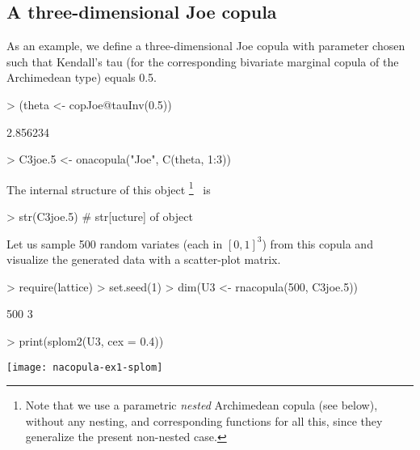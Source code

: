 \documentclass[nojss,article]{jss}
\theoremstyle{mythmstyle}
\begin{document}
\subsection{A three-dimensional Joe copula}
As an example, we define a three-dimensional Joe copula with
parameter chosen such that Kendall's tau (for the corresponding bivariate
marginal copula of the Archimedean type) equals 0.5.
\begin{Schunk}
\begin{Sinput}
> (theta <- copJoe@tauInv(0.5))
\end{Sinput}
\begin{Soutput}
[1] 2.856234
\end{Soutput}
\begin{Sinput}
> C3joe.5 <- onacopula("Joe", C(theta, 1:3))
\end{Sinput}
\end{Schunk}
The internal structure of this object%
\footnote{Note that we use a parametric \emph{nested} Archimedean copula (see
  below), without any nesting, and corresponding 
  functions for all this, since they generalize the present non-nested case.}
\ is
\begin{Schunk}
\begin{Sinput}
> str(C3joe.5) # str[ucture] of object
\end{Sinput}
\end{Schunk}
Let us sample 500 random variates (each in $[0,1]^3$) from this copula
and visualize the generated data with a scatter-plot matrix.
\begin{Schunk}
\begin{Sinput}
> require(lattice)
> set.seed(1)
> dim(U3 <- rnacopula(500, C3joe.5))
\end{Sinput}
\begin{Soutput}
[1] 500   3
\end{Soutput}
\begin{Sinput}
> print(splom2(U3, cex = 0.4))
\end{Sinput}
\end{Schunk}
\texttt{[image: nacopula-ex1-splom]}
\end{document}
